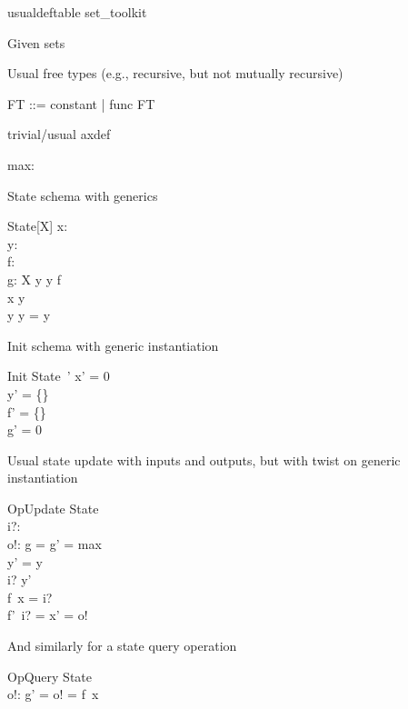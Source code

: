 \documentclass{article}
\begin{document}
\begin{zsection}
\SECTION usualdeftable \parents set\_toolkit
\end{zsection}

Given sets
\begin{zed}
   [G, H]
\end{zed}

Usual free types (e.g., recursive, but not mutually recursive)
\begin{zed}
   FT ::= constant | func \ldata \nat \cross FT \rdata
\end{zed}

trivial/usual axdef
\begin{axdef}
   max: \nat
\end{axdef}

State schema with generics
\begin{schema}{State}[X]
   x: \nat \\
   y: \power~\nat \\
   f: \nat \fun \nat \\
   g: X
\where
   y \cross y \subseteq f \\
   x \in y \\
   y \cap y = y
\end{schema}

Init schema with generic instantiation
\begin{schema}{Init}
   State~'
\where
   x' = 0 \\
   y' = \{\} \\
   f' = \{\} \\
   g' = 0
\end{schema}

Usual state update with inputs and outputs, but with twist on generic instantiation
\begin{schema}{OpUpdate}
   \Delta State \\
   i?: \nat \\
   o!: \nat
\where
   g = g' = max \\ %
   y' = y \\
   i? \in y' \\
   f~x = i? \\
   f'~i? = x' = o!
\end{schema}

And similarly for a state query operation
\begin{schema}{OpQuery}
  \Xi State \\
  o!: \nat
\where
   g' = o! = f~x
\end{schema}
\end{document}
